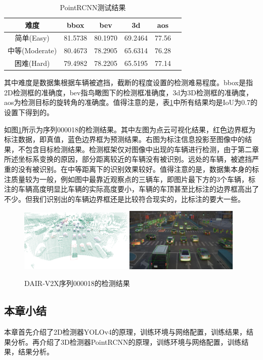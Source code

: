 \begin{table}[htb]
    \centering
    \caption{PointRCNN测试结果}
    \begin{tabular}{c c c c c c}
    \toprule
    难度 & bbox & bev & 3d & aos \\
    \midrule 
    简单(Easy) & 81.5738 & 80.1970 & 69.2464 & 77.56 \\
    中等(Moderate) & 80.4673 & 78.2905 & 65.6314 & 76.28 \\
    困难(Hard) & 79.4982 & 78.2205 & 65.5195 & 77.14 \\
    \bottomrule
    \end{tabular}
    \label{table9}
\end{table}
其中难度是数据集根据车辆被遮挡，截断的程度设置的检测难易程度。bbox是指2D检测框的准确度，bev指鸟瞰图下的检测框准确度，3d为3D检测框的准确度，aos为检测目标的旋转角的准确度。值得注意的是，表\ref{table9}中所有结果均是IoU为0.7的设置下得到的。

如图\ref{fig26}所示为序列000018的检测结果。其中左图为点云可视化结果，红色边界框为标注数据，即真值，蓝色边界框为预测结果。右图为标注信息投影至图像中的结果，不包含目标检测结果。检测框架仅对图像中出现的车辆进行检测，由于第二章所述坐标系变换的原因，部分距离较近的车辆没有被识别。远处的车辆，被遮挡严重的没有被识别。在中等距离下的识别效果较好。值得注意的是，数据集本身的标注质量较为一般，例如图中最靠近观察点的三辆车，即图片最下方的3个车辆，标注的车辆高度明显比车辆的实际高度要小，车辆的车顶甚至比标注的边界框高出了不少。但我们识别出的车辆边界框还是比较符合现实的，比标注的要大一些。

\begin{figure}[htb] 
    \center
    \includegraphics[width=0.48\textwidth]{figure/fig26.png}
    \includegraphics[width=0.48\textwidth]{figure/fig9.png}
    \caption{DAIR-V2X序列000018的检测结果}
    \label{fig26}
\end{figure}

\subsection{本章小结}

本章首先介绍了2D检测器YOLOv4的原理，训练环境与网络配置，训练结果，结果分析。再介绍了3D检测器PointRCNN的原理，训练环境与网络配置，训练结果，结果分析。
